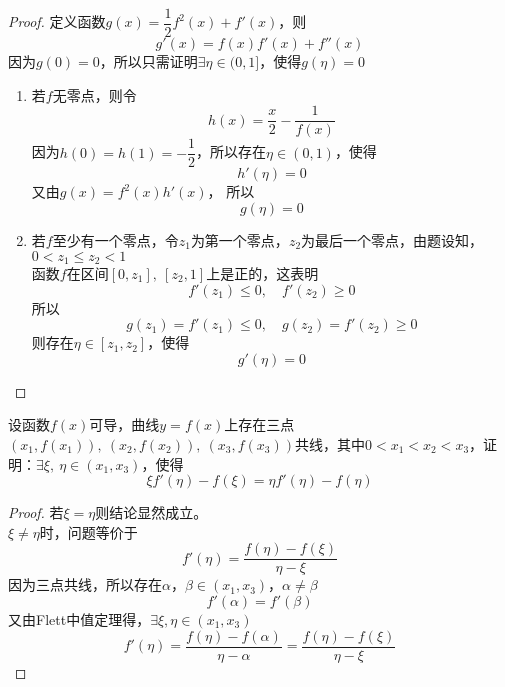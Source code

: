 \begin{proof}

    定义函数$g(x) = \dfrac{1}{2}f^2(x) + f'(x)$，则
    $$g'(x) = f(x) f'(x) + f''(x)$$
    因为$g(0) = 0$，所以只需证明$\exists \eta \in (0,1]$，使得$g(\eta) = 0$

    \begin{enumerate}

        \item 
            若$f$无零点，则令
            $$h(x) = \dfrac{x}{2} - \dfrac{1}{f(x)}$$
            因为$h(0) = h(1) = -\dfrac{1}{2}$，所以存在$\eta \in (0,1)$，使得
            $$h'(\eta) = 0$$
            又由$g(x) = f^2(x) h'(x)$，
            所以
            $$g(\eta) = 0$$

        \item 
            若$f$至少有一个零点，令$z_1$为第一个零点，$z_2$为最后一个零点，由题设知，$0 < z_1 \leq z_2 < 1$\\
            函数$f$在区间$[0,z_1],\ [z_2,1]$上是正的，这表明
            $$f'(z_1) \leq 0,\quad f'(z_2) \geq 0$$
            所以
            $$g(z_1) = f'(z_1) \leq 0, \quad g(z_2) = f'(z_2) \geq 0$$
            则存在$\eta \in [z_1,z_2]$，使得
            $$g'(\eta) = 0$$

    \end{enumerate}

\end{proof}

\begin{proposition}

    设函数$f(x)$可导，曲线$y = f(x)$上存在三点$(x_1,f(x_1)),\ (x_2,f(x_2)), \ (x_3,f(x_3))$共线，其中$0 < x_1 < x_2 < x_3$，证明：$\exists \xi,\  \eta \in (x_1,x_3)$，使得
    $$\xi f'(\eta) - f(\xi) = \eta f'(\eta) - f(\eta)$$

\end{proposition}

\begin{proof}

    若$\xi = \eta$则结论显然成立。\\
    $\xi \neq \eta$时，问题等价于
    $$ f'(\eta) = \dfrac{f(\eta) - f(\xi)}{\eta - \xi}$$
    因为三点共线，所以存在$\alpha$，$\beta \in (x_1, x_3)$，$\alpha \neq \beta$
    $$f'(\alpha) = f'(\beta)$$
    又由\textup{Flett}中值定理得，$\exists \xi,\eta \in (x_1,x_3)$
    $$f'(\eta) = \dfrac{f(\eta) - f(\alpha)}{\eta - \alpha} = \dfrac{f(\eta) - f(\xi)}{\eta - \xi}$$

\end{proof}


